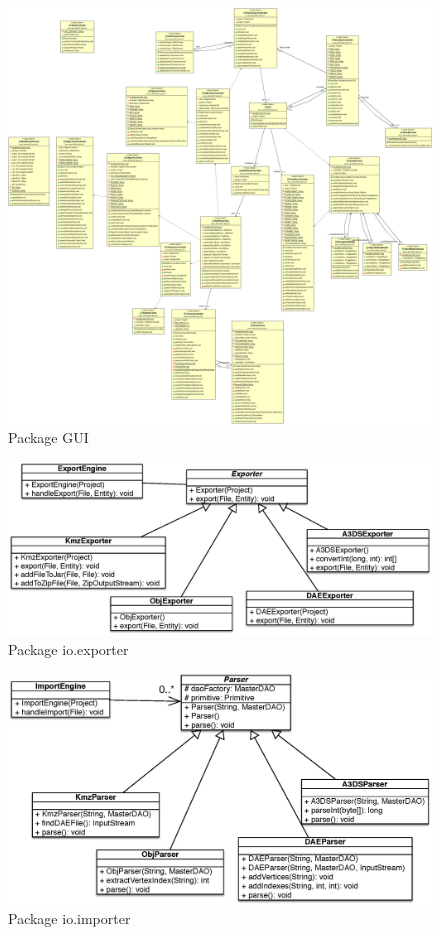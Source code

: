 	\begin{figure}
		\center
		\includegraphics[width=\textwidth]{iteration4/fig/gui-final.png}
		\caption{Package GUI}
	\end{figure}

	\begin{figure}
		\center
		\includegraphics[width=\textwidth]{iteration4/fig/exportfactory.eps}
		\caption{Package io.exporter}
	\end{figure}

	\begin{figure}
		\center
		\includegraphics[width=\textwidth]{iteration4/fig/ParsersArchi.eps}
		\caption{Package io.importer}
	\end{figure}


